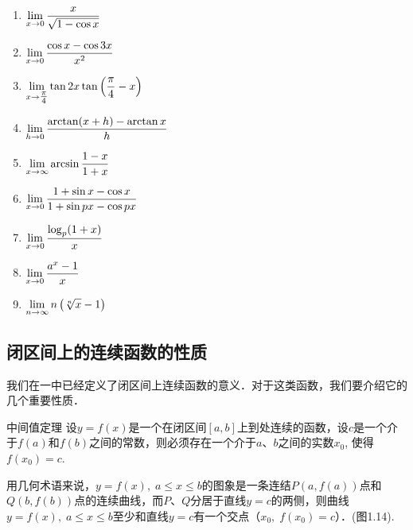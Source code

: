 \begin{ex}
\begin{enumerate}
\begin{multicols}{2}
\begin{enumerate}
\item $\displaystyle\lim_{x\to 0}\dfrac{x}{\sqrt{1-\cos x}}$
\item $\displaystyle\lim_{x\to 0}\dfrac{\cos x-\cos 3x}{x^2}$
\item $\displaystyle\lim_{x\to \tfrac{\pi}{4}}\tan 2x\tan\left(\dfrac{\pi}{4}-x\right)$
\item $\displaystyle\lim_{h\to 0}\dfrac{\arctan (x+h)-\arctan x}{h}$
\item $\displaystyle\lim_{x\to \infty}\arcsin \dfrac{1-x}{1+x}$
\item $\displaystyle\lim_{x\to 0}\dfrac{1+\sin x-\cos x}{1+\sin px-\cos px}$
\item $\displaystyle\lim_{x\to 0}\dfrac{\log_p(1+x)}{x}$
\item $\displaystyle\lim_{x\to 0}\dfrac{a^x-1}{x}$
\item $\displaystyle\lim_{n\to \infty}n\left(\sqrt[n]{x}-1\right)$
    \end{enumerate}
\end{multicols}
\end{enumerate}
\end{ex}

\subsection{闭区间上的连续函数的性质}

我们在一中已经定义了闭区间上连续函数的意义．对于这类函数，我们要介绍它的几个重要性质．

\begin{blk}
    {中间值定理} 设$y=f(x)$是一个在闭区间$[a,b]$上到处连续的函数，设$c$是一个介于$f(a)$和$f(b)$之间的常数，则必须存在一个介于$a$、$b$之间的实数$x_0$, 使得$f(x_0)=c$.
\end{blk}

用几何术语来说，$y=f(x),\; a\le x\le b$的图象是一条连结$P(a,f(a))$点和$Q(b,f(b))$点的连续曲线，而$P$、$Q$分居于直线$y=c$的两侧，则曲线$y=f(x),\; a\le x\le b$至少和直线$y=c$有一个交点（$x_0,\; f(x_0)=c$）．(图1.14).
\begin{figure}[htp]
    \centering
{}
    \caption{}
\end{figure}



